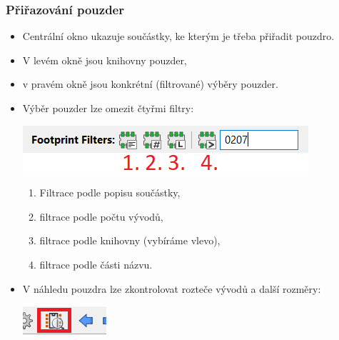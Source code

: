 \documentclass{beamer}
\begin{document}
\begin{frame}
	\frametitle{Přiřazování pouzder}
	\small
	\begin{itemize}
		\item Centrální okno ukazuje součástky, ke kterým je třeba přiřadit pouzdro.
		\item V levém okně jsou knihovny pouzder,
		\item v pravém okně jsou konkrétní (filtrované) výběry pouzder.
		\item Výběr pouzder lze omezit čtyřmi filtry:
			\begin{center}
				\includegraphics[scale=0.6]{obr/pouzdra02.png}
			\end{center}
			
			\begin{enumerate}
				\item Filtrace podle popisu součástky,
				\item filtrace podle počtu vývodů,
				\item filtrace podle knihovny (vybíráme vlevo),
				\item filtrace podle části názvu.
			\end{enumerate}
		\item V náhledu pouzdra lze zkontrolovat rozteče vývodů a další rozměry:
			\begin{center}
				\includegraphics[scale=0.6]{obr/pouzdra03.png}
			\end{center}
	\end{itemize}
	
\end{frame}

  
\end{document}
